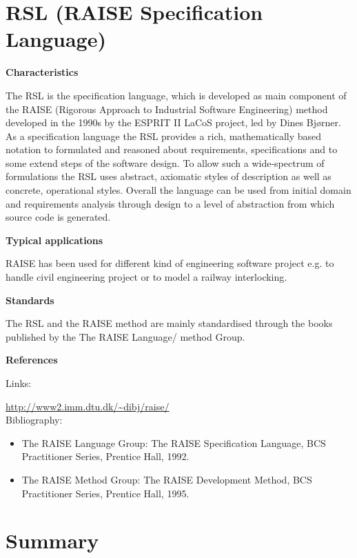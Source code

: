 \documentclass{./template/openetcs_report}
\begin{document}
\section {RSL (RAISE Specification Language)}


	\textbf{Characteristics}

The RSL is the specification language, which is developed as main component of the RAISE (Rigorous Approach to Industrial Software Engineering) method developed in the 1990s by the ESPRIT II LaCoS project, led by Dines Bjørner. As a specification language the RSL provides a rich, mathematically based notation to formulated and reasoned about requirements, specifications and to some extend steps of the software design. To allow such a wide-spectrum of formulations the RSL uses abstract, axiomatic styles of description as well as concrete, operational styles. Overall the language can be used from initial domain and requirements analysis through design to a level of abstraction from which source code is generated. 

	\textbf{Typical applications}

RAISE has been used for different kind of engineering software project e.g. to handle civil engineering project or to model a railway interlocking.

	\textbf{Standards}

The RSL and the RAISE method are mainly standardised through the books published by the The RAISE Language/ method Group.

	\textbf{References}

Links:

\url{http://www2.imm.dtu.dk/~dibj/raise/} \\[4pt]


Bibliography:

\begin{itemize}
\item The RAISE Language Group: The RAISE Specification Language, BCS Practitioner Series, Prentice Hall, 1992.
\item The RAISE Method Group: The RAISE Development Method, BCS Practitioner Series, Prentice Hall, 1995. 
\end{itemize}

\section{Summary}
\end{document}
